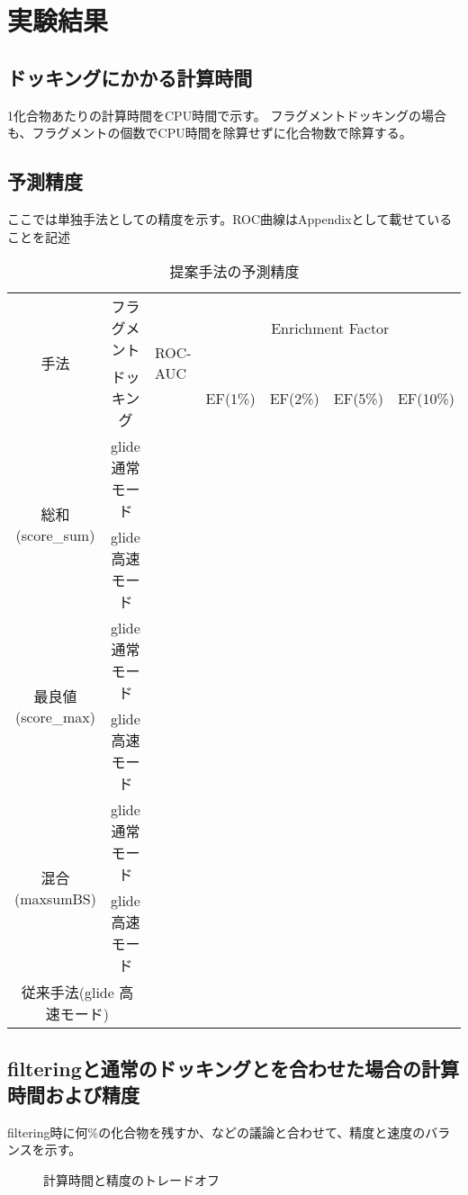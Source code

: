 \section{実験結果}


\subsection{ドッキングにかかる計算時間}
1化合物あたりの計算時間をCPU時間で示す。
フラグメントドッキングの場合も、フラグメントの個数でCPU時間を除算せずに化合物数で除算する。

\subsection{予測精度}
ここでは単独手法としての精度を示す。ROC曲線はAppendixとして載せていることを記述

\begin{table}[htb] \centering
	\caption{提案手法の予測精度}
	\label{tb:filtering_accuracy}
	\begin{tabular}{c|c|lllll|}
	\multirow{2}{*}{手法}				&フラグメント		&\multirow{2}{*}{ROC-AUC}	&\multicolumn{4}{c}{Enrichment Factor}	\\
									&ドッキング		&						&EF(1\%)	&EF(2\%)	&EF(5\%)	&EF(10\%)	\\ \hline
	\multirow{2}{*}{総和(score\_sum)}		&glide 通常モード	&						&		&		&		&			\\
									&glide 高速モード	&						&		&		&		&			\\
	\multirow{2}{*}{最良値(score\_max)}	&glide 通常モード	&						&		&		&		&			\\
									&glide 高速モード	&						&		&		&		&			\\
	\multirow{2}{*}{混合(maxsumBS)}		&glide 通常モード	&						&		&		&		&			\\
									&glide 高速モード	&						&		&		&		&			\\ \hline
	\multicolumn{2}{c|}{従来手法(glide 高速モード)}			&						&		&		&		&			\\ \hline
	\end{tabular}
\end{table}

\subsection{filteringと通常のドッキングとを合わせた場合の計算時間および精度}
filtering時に何\%の化合物を残すか、などの議論と合わせて、精度と速度のバランスを示す。
\begin{figure}[htp]
 \begin{center}
  \caption{計算時間と精度のトレードオフ}
  \label{fig:trade_off}
 \end{center}
\end{figure}
